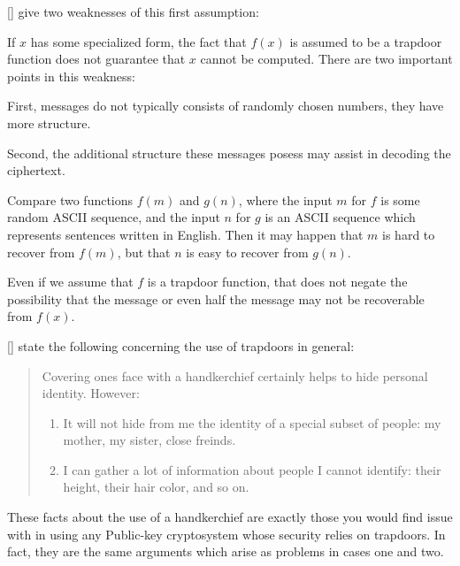 [\cite{Gol19820}] give two weaknesses of this first assumption:


\begin{rem}
 If $x$ has some specialized form, the fact that $f(x)$ is assumed to be a trapdoor function does not guarantee that $x$ cannot be computed. There are two important points in this weakness:
\end{rem}

\begin{case}
First, messages do not typically consists of randomly chosen numbers, they have more structure.
\end{case}

\begin{case}
Second, the additional structure these messages posess may assist in decoding the ciphertext.
\end{case} 

\begin{exmp}
Compare two functions $f(m)$ and $g(n)$, where the input $m$ for $f$ is some random ASCII sequence, and the input $n$ for $g$ is an ASCII sequence which represents sentences written in English. Then it may happen that $m$ is hard to recover from $f(m)$, but that $n$ is easy to recover from $g(n)$.
\end{exmp}

\begin{rem}
Even if we assume that $f$ is a trapdoor function, that does not negate the possibility that the message or even half the message may not be recoverable from $f(x)$. 
\end{rem}


[\cite{Gol19820}] state the following concerning the use of trapdoors in general:
\begin{quotation}
    Covering ones face with a handkerchief certainly helps to hide personal identity. However:
    \begin{enumerate}
         \item It will not hide from me the identity of a special subset of people: my mother, my sister, close freinds.
         \item I can gather a lot of information about people I cannot identify: their height, their hair color, and so on.
    \end{enumerate}
\end{quotation}

These facts about the use of a handkerchief are exactly those you would find issue with in using any Public-key cryptosystem whose security relies on trapdoors. In fact, they are the same arguments which arise as problems in cases one and two. 

